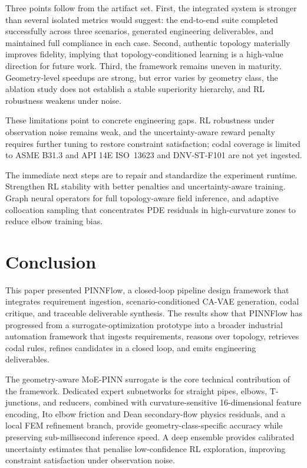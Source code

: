 \documentclass[conference]{IEEEtran}
\begin{document}
Three points follow from the artifact set. First, the integrated system is stronger than several isolated metrics would suggest: the end-to-end suite completed successfully across three scenarios, generated engineering deliverables, and maintained full compliance in each case. Second, authentic topology materially improves fidelity, implying that topology-conditioned learning is a high-value direction for future work. Third, the framework remains uneven in maturity. Geometry-level speedups are strong, but error varies by geometry class, the ablation study does not establish a stable superiority hierarchy, and RL robustness weakens under noise.
 
These limitations point to concrete engineering gaps. RL robustness under observation noise remains weak, and the uncertainty-aware reward penalty requires further tuning to restore constraint satisfaction; codal coverage is limited to ASME B31.3 and API 14E ISO~13623 and DNV-ST-F101 are not yet ingested.
 
The immediate next steps are to repair and standardize the experiment runtime. Strengthen RL stability with better penalties and uncertainty-aware training. Graph neural operators for full topology-aware field inference, and adaptive collocation sampling that concentrates PDE residuals in high-curvature zones to reduce elbow training bias.
 
\section{Conclusion}

This paper presented PINNFlow, a closed-loop pipeline design framework that integrates requirement ingestion, scenario-conditioned CA-VAE generation, codal critique, and traceable deliverable synthesis. The results show that PINNFlow has progressed from a surrogate-optimization prototype into a broader industrial automation framework that ingests requirements, reasons over topology, retrieves codal rules, refines candidates in a closed loop, and emits engineering deliverables.
 
The geometry-aware MoE-PINN surrogate is the core technical contribution of the framework. Dedicated expert subnetworks for straight pipes, elbows, T-junctions, and reducers, combined with curvature-sensitive 16-dimensional feature encoding, Ito elbow friction and Dean secondary-flow physics residuals, and a local FEM refinement branch, provide geometry-class-specific accuracy while preserving sub-millisecond inference speed. A deep ensemble provides calibrated uncertainty estimates that penalise low-confidence RL exploration, improving constraint satisfaction under observation noise.
 
\end{document}
